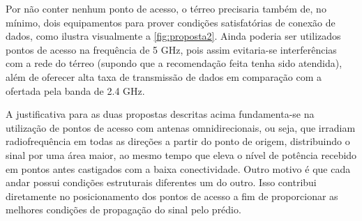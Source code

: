 \begin{figure}[H]
	\centering
\end{figure}

Por não conter nenhum ponto de acesso, o térreo precisaria também de, no mínimo, dois equipamentos para prover condições satisfatórias de conexão de dados, como ilustra visualmente a  \autoref{fig:proposta2}. Ainda poderia ser utilizados pontos de acesso na frequência de 5 GHz, pois assim evitaria-se interferências com a rede do térreo (supondo que a recomendação feita tenha sido atendida), além de oferecer alta taxa de transmissão de dados em comparação com a ofertada pela banda de 2.4 GHz.

\begin{figure}[H]
	\centering
\end{figure}

A justificativa para as duas propostas descritas acima fundamenta-se na utilização de pontos de acesso com antenas omnidirecionais, ou seja, que irradiam radiofrequência em todas as direções a partir do ponto de origem, distribuindo o sinal por uma área maior, ao mesmo tempo que eleva o nível de potência recebido em pontos antes castigados com a baixa conectividade. Outro motivo é que cada andar possui condições estruturais diferentes um do outro. Isso contribui diretamente no posicionamento dos pontos de acesso a fim de proporcionar as melhores condições de propagação do sinal pelo prédio.